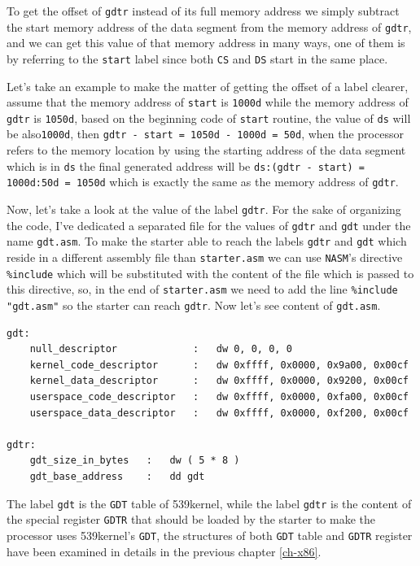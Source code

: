 To get the offset of \lstinline!gdtr! instead of its full memory address
we simply subtract the start memory address of the data segment from the
memory address of \lstinline!gdtr!, and we can get this value of that
memory address in many ways, one of them is by referring to the
\lstinline!start! label since both \lstinline!CS! and \lstinline!DS!
start in the same place.

Let's take an example to make the matter of getting the offset of a
label clearer, assume that the memory address of \lstinline!start! is
\lstinline!1000d! while the memory address of \lstinline!gdtr! is
\lstinline!1050d!, based on the beginning code of \lstinline!start!
routine, the value of \lstinline!ds! will be also\lstinline!1000d!, then
\lstinline!gdtr - start = 1050d - 1000d = 50d!, when the processor
refers to the memory location by using the starting address of the data
segment which is in \lstinline!ds! the final generated address will be
\lstinline!ds:(gdtr - start) = 1000d:50d = 1050d! which is exactly the
same as the memory address of \lstinline!gdtr!.

Now, let's take a look at the value of the label \lstinline!gdtr!. For
the sake of organizing the code, I've dedicated a separated file for the
values of \lstinline!gdtr! and \lstinline!gdt! under the name
\lstinline!gdt.asm!. To make the starter able to reach the labels
\lstinline!gdtr! and \lstinline!gdt! which reside in a different
assembly file than \lstinline!starter.asm! we can use \lstinline!NASM!'s
directive \lstinline!%include! which will be substituted with the
content of the file which is passed to this directive, so, in the end of
\lstinline!starter.asm! we need to add the line
\lstinline!%include "gdt.asm"! so the starter can reach
\lstinline!gdtr!. Now let's see content of \lstinline!gdt.asm!.

\begin{lstlisting}
gdt:
    null_descriptor             :   dw 0, 0, 0, 0
    kernel_code_descriptor      :   dw 0xffff, 0x0000, 0x9a00, 0x00cf
    kernel_data_descriptor      :   dw 0xffff, 0x0000, 0x9200, 0x00cf
    userspace_code_descriptor   :   dw 0xffff, 0x0000, 0xfa00, 0x00cf
    userspace_data_descriptor   :   dw 0xffff, 0x0000, 0xf200, 0x00cf

gdtr:
    gdt_size_in_bytes   :   dw ( 5 * 8 )
    gdt_base_address    :   dd gdt
\end{lstlisting}

The label \lstinline!gdt! is the \lstinline!GDT! table of 539kernel,
while the label \lstinline!gdtr! is the content of the special register
\lstinline!GDTR! that should be loaded by the starter to make the
processor uses 539kernel's \lstinline!GDT!, the structures of both
\lstinline!GDT! table and \lstinline!GDTR! register have been examined
in details in the previous chapter \ref{ch-x86}.

